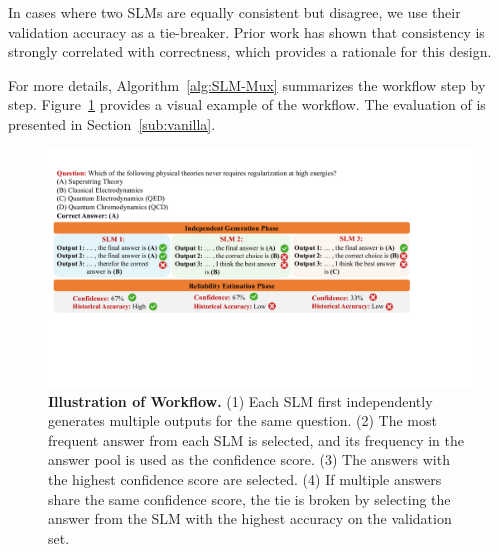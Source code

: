In cases where two SLMs are equally consistent but disagree, we use their validation accuracy as a tie-breaker. Prior work has shown that consistency is strongly correlated with correctness, which provides a rationale for this design.

For more details, Algorithm~\ref{alg:SLM-Mux} summarizes the workflow step by step. Figure~\ref{fig:SLM-Mux-method} provides a visual example of the workflow. The evaluation of \NAME{}{} is presented in Section~\ref{sub:vanilla}.


\begin{figure}[t]
  \centering
  \includegraphics[width=\linewidth]{Figures/LM-Mux_workflow_v2.pdf}
  \vspace{-12pt}
  \caption{\small \textbf{Illustration of \NAME{}{} Workflow.}
(1) Each SLM first independently generates multiple outputs for the same question.
(2) The most frequent answer from each SLM is selected, and its frequency in the answer pool is used as the confidence score.
(3) The answers with the highest confidence score are selected.
(4) If multiple answers share the same confidence score, the tie is broken by selecting the answer from the SLM with the highest accuracy on the validation set. }
  \label{fig:SLM-Mux-method}
  \vspace{-20pt}
\end{figure}
